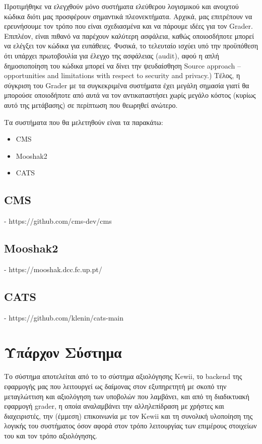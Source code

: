 \documentclass[diploma]{softlab-thesis}
\begin{document}
Προτιμήθηκε να ελεγχθούν μόνο συστήματα ελεύθερου λογισμικού και ανοιχτού
κώδικα διότι μας προσφέρουν σημαντικά πλεονεκτήματα. Αρχικά, μας επιτρέπουν να
ερευνήσουμε τον τρόπο που είναι σχεδιασμένα και να πάρουμε ιδέες για τον
Grader. Επιπλέον, είναι πιθανό να παρέχουν καλύτερη ασφάλεια, καθώς
οποιοσδήποτε μπορεί να ελέγξει τον κώδικα για ευπάθειες. Φυσικά, το τελευταίο
ισχύει υπό την προϋπόθεση ότι υπάρχει πρωτοβουλία για έλεγχο της ασφάλειας
(audit), αφού η απλή δημοσιοποίηση του κώδικα μπορεί να δίνει την ψευδαίσθηση
Source approach – opportunities and limitations with respect to security and
privacy.) Τέλος, η σύγκριση του Grader με τα συγκεκριμένα συστήματα έχει μεγάλη
σημασία γιατί θα μπορούσε οποιοδήποτε από αυτά να τον αντικαταστήσει χωρίς
μεγάλο κόστος (κυρίως αυτό της μετάβασης) σε περίπτωση που θεωρηθεί ανώτερο.

\bigskip

Τα συστήματα που θα μελετηθούν είναι τα παρακάτω:

\begin{itemize}
    \setlength\itemsep{0em}
    \item CMS
    \item Mooshak2
    \item CATS
\end{itemize}

\section{CMS}

- https://github.com/cms-dev/cms

\section{Mooshak2}

- https://mooshak.dcc.fc.up.pt/

\section{CATS}

- https://github.com/klenin/cats-main

\chapter{Υπάρχον Σύστημα}

Το σύστημα αποτελείται από το το σύστημα αξιολόγησης Kewii, το backend της
εφαρμογής μας που λειτουργεί ως δαίμονας στον εξυπηρετητή με σκοπό την
μεταγλώττιση και αξιολόγηση των υποβολών που λαμβάνει, και από τη διαδικτυακή
εφαρμογή grader, η οποία αναλαμβάνει την αλληλεπίδραση με χρήστες και
διαχειριστές, την (έμμεση) επικοινωνία με τον Kewii και τη συνολική υλοποίηση
της λογικής του συστήματος όσον αφορά στον τρόπο λειτουργίας των επιμέρους
στοιχείων του και τον τρόπο αξιολόγησης.
\end{document}
